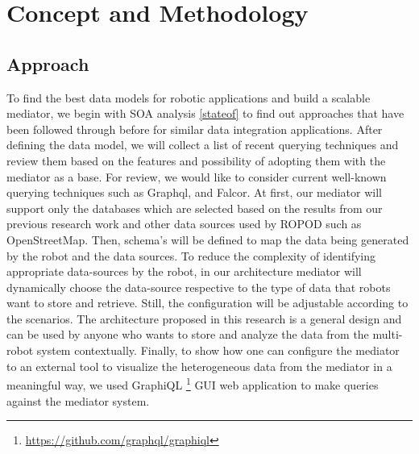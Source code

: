 

	\let\cleardoublepage\clearpage
\chapter{Concept and Methodology}\label{sec:concept_and_methodology}

\section{Approach}\label{sec:approach}
To find the best data models for robotic applications and build a scalable mediator, we begin with SOA analysis \ref{stateof} to find out approaches that have been followed through before for similar data integration applications. After defining the data model, we will collect a list of recent querying techniques and review them based on the features and possibility of adopting them with the mediator as a base.  For review, we would like to consider current well-known querying techniques such as Graphql, and Falcor. At first, our mediator will support only the databases which are selected based on the results from our previous research work \cite{ravichandranworkbench} and other data sources used by ROPOD such as OpenStreetMap. Then, schema's will be defined to map the data being generated by the robot and the data sources. To reduce the complexity of identifying appropriate data-sources by the robot, in our architecture mediator will dynamically choose the data-source respective to the type of data that robots want to store and retrieve. Still, the configuration will be adjustable according to the scenarios. The architecture proposed in this research is a general design and can be used by anyone who wants to store and analyze the data from the multi-robot system contextually. Finally, to show how one can configure the mediator to an external tool to visualize the heterogeneous data from the mediator in a meaningful way, we used GraphiQL \footnote{\href{https://github.com/graphql/graphiql}{https://github.com/graphql/graphiql}} GUI web application to make queries against the mediator system.

